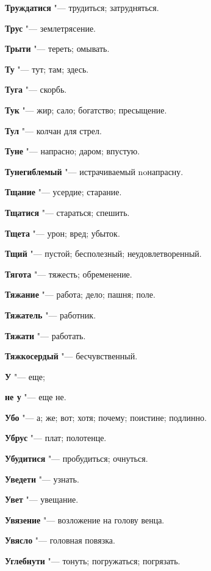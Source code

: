 \begin{mymulticols}
\noindent\textbf{Труждатися} "--- трудиться; затрудняться. 

\noindent\textbf{Трус} "--- землетрясение. 

\noindent\textbf{Трыти} "--- тереть; омывать. 

\noindent\textbf{Ту} "--- тут; там; здесь. 

\noindent\textbf{Туга} "--- скорбь. 

\noindent\textbf{Тук} "--- жир; сало; богатство; пресыщение. 

\noindent\textbf{Тул} "--- колчан для стрел. 

\noindent\textbf{Туне} "--- напрасно; даром; впустую. 

\noindent\textbf{Тунегиблемый} "--- истрачиваемый noнапрасну. 

\noindent\textbf{Тщание} "--- усердие; старание. 

\noindent\textbf{Тщатися} "--- стараться; спешить. 

\noindent\textbf{Тщета} "--- урон; вред; убыток. 

\noindent\textbf{Тщий} "--- пустой; бесполезный; неудовлетворенный. 

\noindent\textbf{Тягота} "--- тяжесть; обременение. 

\noindent\textbf{Тяжание} "--- работа; дело; пашня; поле. 

\noindent\textbf{Тяжатель} "--- работник. 

\noindent\textbf{Тяжати} "--- работать. 

\noindent\textbf{Тяжкосердый} "--- бесчувственный. 

\bukvaending


\noindent\textbf{У} "--- еще; 

\noindent\textbf{не у} "--- еще не. 

\noindent\textbf{Убо} "--- а; же; вот; хотя; почему; поистине; подлинно. 

\noindent\textbf{Убрус} "--- плат; полотенце. 

\noindent\textbf{Убудитися} "--- пробудиться; очнуться. 

\noindent\textbf{Уведети} "--- узнать. 

\noindent\textbf{Увет} "--- увещание. 

\noindent\textbf{Увязение} "--- возложение на голову венца. 

\noindent\textbf{Увясло} "--- головная повязка. 

\noindent\textbf{Углебнути} "--- тонуть; погружаться; погрязать. 


\end{mymulticols}
